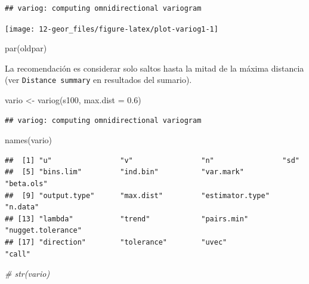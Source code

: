\documentclass[
  spanish,
]{book}
\newenvironment{Shaded}{\begin{snugshade}}{\end{snugshade}}
\newcommand{\AttributeTok}[1]{\textcolor[rgb]{0.77,0.63,0.00}{#1}}
\newcommand{\CommentTok}[1]{\textcolor[rgb]{0.56,0.35,0.01}{\textit{#1}}}
\newcommand{\FloatTok}[1]{\textcolor[rgb]{0.00,0.00,0.81}{#1}}
\newcommand{\FunctionTok}[1]{\textcolor[rgb]{0.00,0.00,0.00}{#1}}
\newcommand{\NormalTok}[1]{#1}
\newcommand{\OtherTok}[1]{\textcolor[rgb]{0.56,0.35,0.01}{#1}}
\theoremstyle{break}
\theoremstyle{definition}
\theoremstyle{definition}
\theoremstyle{definition}
\theoremstyle{definition}
\theoremstyle{remark}
\begin{document}
\begin{verbatim}
## variog: computing omnidirectional variogram
\end{verbatim}

\begin{center}\texttt{[image: 12-geor\_files/figure-latex/plot-variog1-1]} \end{center}

\begin{Shaded}
\begin{Highlighting}[]
\FunctionTok{par}\NormalTok{(oldpar)}
\end{Highlighting}
\end{Shaded}

La recomendación es considerar solo saltos hasta la mitad de la máxima
distancia (ver \texttt{Distance\ summary} en resultados del sumario).

\begin{Shaded}
\begin{Highlighting}[]
\NormalTok{vario }\OtherTok{\textless{}{-}} \FunctionTok{variog}\NormalTok{(s100, }\AttributeTok{max.dist =} \FloatTok{0.6}\NormalTok{)}
\end{Highlighting}
\end{Shaded}

\begin{verbatim}
## variog: computing omnidirectional variogram
\end{verbatim}

\begin{Shaded}
\begin{Highlighting}[]
\FunctionTok{names}\NormalTok{(vario)}
\end{Highlighting}
\end{Shaded}

\begin{verbatim}
##  [1] "u"                "v"                "n"                "sd"              
##  [5] "bins.lim"         "ind.bin"          "var.mark"         "beta.ols"        
##  [9] "output.type"      "max.dist"         "estimator.type"   "n.data"          
## [13] "lambda"           "trend"            "pairs.min"        "nugget.tolerance"
## [17] "direction"        "tolerance"        "uvec"             "call"
\end{verbatim}

\begin{Shaded}
\begin{Highlighting}[]
\CommentTok{\# str(vario)}
\end{Highlighting}
\end{Shaded}
\end{document}
